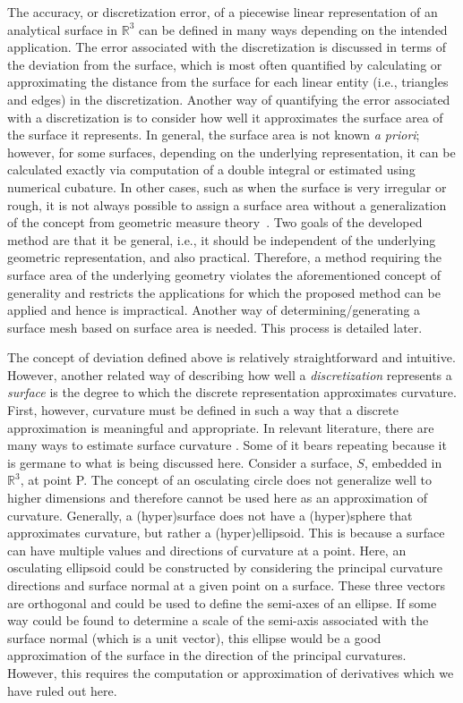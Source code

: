 The accuracy, or discretization error, of a piecewise linear
representation of an analytical surface in ${\mathbb R}^3$ can be
defined in many ways depending on the intended application. The error
associated with the discretization is discussed in terms of the
deviation from the surface, which is most often quantified by calculating 
or approximating the distance from the surface for each linear entity
(i.e., triangles and edges) in the discretization.  Another way of 
quantifying
the error associated with a discretization is to consider how well
it approximates the surface area of the surface it represents.  In
general, the surface area is not known {\it a priori}; however, for some
surfaces, depending on the underlying representation, it can be 
calculated exactly via computation of a double integral or estimated using 
numerical cubature.  In other cases, such as when the surface is very 
irregular or rough, it is not always possible to assign a surface area
without a generalization of the concept from geometric measure 
theory~\cite{gmt}.  Two goals of the developed 
method are that it be general, i.e., it 
should be independent of the underlying geometric representation, and 
also practical.  Therefore, a method requiring the surface area of the 
underlying geometry violates the aforementioned concept of 
generality and restricts the applications for which the proposed method 
can be applied and hence is impractical.  Another way of 
determining/generating a surface mesh based on surface area is needed. 
This process is detailed later.

The concept of deviation defined above is relatively straightforward and
intuitive. However, another related way of describing how well a
\textit{discretization} represents a \textit{surface} is the degree to
which the discrete representation approximates curvature. First,
however, curvature must be defined in such a way that a discrete
approximation is meaningful and appropriate. In relevant literature,
there are many ways to estimate surface curvature \cite{hermann07}. Some
of it bears repeating because it is germane to what is being discussed
here.  Consider a surface, $S$, embedded in ${\mathbb R}^3$, at point P.
The concept of an osculating circle \cite{weissteineOsculatingCircle}
does not generalize well to higher dimensions and therefore cannot be
used here as an approximation of curvature. Generally, a (hyper)surface
does not have a (hyper)sphere that approximates curvature, but rather a
(hyper)ellipsoid. This is because a surface can have multiple values and
directions of curvature at a point. Here, an osculating ellipsoid could
be constructed by considering the principal curvature directions and
surface normal at a given point on a surface. These three vectors are
orthogonal and could be used to define the semi-axes of an ellipse. If
some way could be found to determine a scale of the semi-axis associated
with the surface normal (which is a unit vector), this ellipse would be
a good approximation of the surface in the direction of the principal
curvatures. However, this requires the computation or approximation of
derivatives which we have ruled out here.

